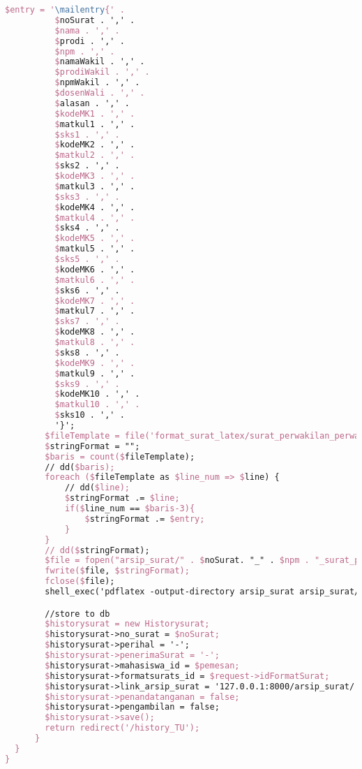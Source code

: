 \begin{lstlisting}[language=tex,basicstyle=\tiny,caption=HistorysuratController.php]
        $entry = '\mailentry{' .
          $noSurat . ',' .
          $nama . ',' .
          $prodi . ',' .
          $npm . ',' .
          $namaWakil . ',' .
          $prodiWakil . ',' .
          $npmWakil . ',' .
          $dosenWali . ',' .
          $alasan . ',' .
          $kodeMK1 . ',' .
          $matkul1 . ',' .
          $sks1 . ',' .
          $kodeMK2 . ',' .
          $matkul2 . ',' .
          $sks2 . ',' .
          $kodeMK3 . ',' .
          $matkul3 . ',' .
          $sks3 . ',' .
          $kodeMK4 . ',' .
          $matkul4 . ',' .
          $sks4 . ',' .
          $kodeMK5 . ',' .
          $matkul5 . ',' .
          $sks5 . ',' .
          $kodeMK6 . ',' .
          $matkul6 . ',' .
          $sks6 . ',' .
          $kodeMK7 . ',' .
          $matkul7 . ',' .
          $sks7 . ',' .
          $kodeMK8 . ',' .
          $matkul8 . ',' .
          $sks8 . ',' .
          $kodeMK9 . ',' .
          $matkul9 . ',' .
          $sks9 . ',' .
          $kodeMK10 . ',' .
          $matkul10 . ',' .
          $sks10 . ',' .
          '}';
        $fileTemplate = file('format_surat_latex/surat_perwakilan_perwalian_10mk.tex');
        $stringFormat = "";
        $baris = count($fileTemplate);
        // dd($baris);
        foreach ($fileTemplate as $line_num => $line) {
            // dd($line);
            $stringFormat .= $line;
            if($line_num == $baris-3){
                $stringFormat .= $entry;
            }
        }
        // dd($stringFormat);
        $file = fopen("arsip_surat/" . $noSurat. "_" . $npm . "_surat_perwakilan_perwalian_10mk.tex", "w");
        fwrite($file, $stringFormat);
        fclose($file);
        shell_exec('pdflatex -output-directory arsip_surat arsip_surat/' . $noSurat . '_' . $npm . '_surat_perwakilan_perwalian_10mk.tex');

        //store to db
        $historysurat = new Historysurat;
        $historysurat->no_surat = $noSurat;
        $historysurat->perihal = '-';
        $historysurat->penerimaSurat = '-';
        $historysurat->mahasiswa_id = $pemesan;
        $historysurat->formatsurats_id = $request->idFormatSurat;
        $historysurat->link_arsip_surat = '127.0.0.1:8000/arsip_surat/' . $noSurat. '_' . $npm . '_surat_perwakilan_perwalian_10mk.pdf';
        $historysurat->penandatanganan = false;
        $historysurat->pengambilan = false;
        $historysurat->save();
        return redirect('/history_TU');
      }
  }
}

\end{lstlisting}

